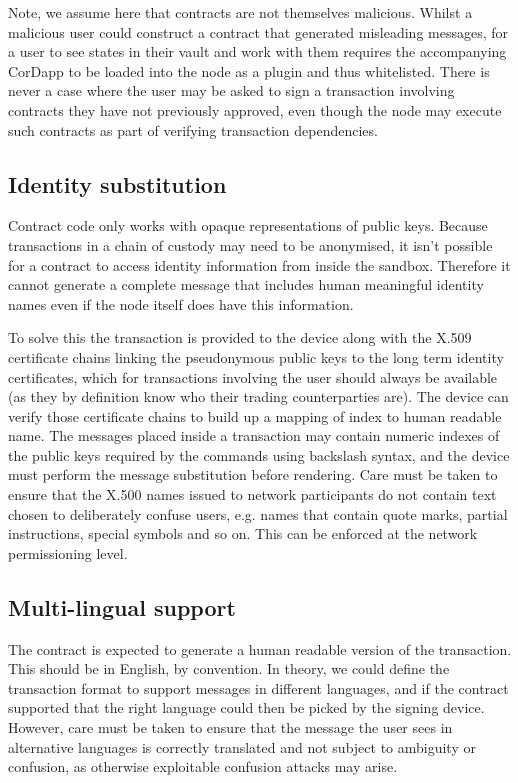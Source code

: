 \documentclass{article}
\begin{document}
Note, we assume here that contracts are not themselves malicious. Whilst a malicious user could construct a contract that
generated misleading messages, for a user to see states in their vault and work with them requires the accompanying
CorDapp to be loaded into the node as a plugin and thus whitelisted. There is never a case where the user may be asked
to sign a transaction involving contracts they have not previously approved, even though the node may execute such
contracts as part of verifying transaction dependencies.

\subsection{Identity substitution}

Contract code only works with opaque representations of public keys. Because transactions in a chain of custody may need
to be anonymised, it isn't possible for a contract to access identity information from inside the sandbox. Therefore it
cannot generate a complete message that includes human meaningful identity names even if the node itself does have this
information.

To solve this the transaction is provided to the device along with the X.509 certificate chains
linking the pseudonymous public keys to the long term identity certificates, which for transactions involving the user
should always be available (as they by definition know who their trading counterparties are). The device can verify
those certificate chains to build up a mapping of index to human readable name. The messages placed inside a transaction may contain numeric indexes of the public keys required by the
commands using backslash syntax, and the device must perform the message substitution before rendering.
Care must be taken to ensure that the X.500 names issued to network participants do not contain text chosen to
deliberately confuse users, e.g. names that contain quote marks, partial instructions, special symbols and so on.
This can be enforced at the network permissioning level.

\subsection{Multi-lingual support}

The contract is expected to generate a human readable version of the transaction. This should be in English, by
convention. In theory, we could define the transaction format to support messages in different languages, and if
the contract supported that the right language could then be picked by the signing device. However, care must be taken
to ensure that the message the user sees in alternative languages is correctly translated and not subject to ambiguity
or confusion, as otherwise exploitable confusion attacks may arise.
\end{document}
